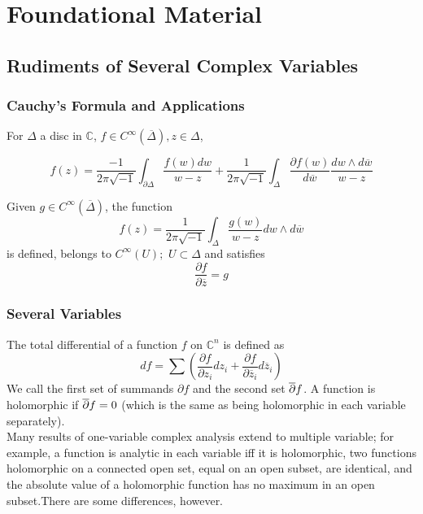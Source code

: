 
\section{Foundational Material}
\subsection{Rudiments of Several Complex Variables}
\subsubsection{Cauchy's Formula and Applications}


\begin{thm}

	For $\Delta$ a disc in $ \mathbb{C}$, $f \in C^{\infty}( \overline{\Delta} ), z \in \Delta$,

\[
	f(z) = \frac{-1}{2 \pi \sqrt{-1}} \int_{\partial \Delta} \frac{f(w)dw}{w-z}+ \frac{1}{2 \pi \sqrt{-1}} \int_{\Delta} \frac{\partial f(w)}{d \overline{w}} \frac{dw \wedge d \overline{w}}{w-z}
\]

\end{thm}



\begin{lem}

	Given $g \in C^{\infty}( \overline{\Delta} ) $, the function
\[
	f(z) = \frac{1}{2 \pi \sqrt{-1}} \int_{\Delta} \frac{g(w)}{w-z} dw \wedge d \overline{w}
\]
is defined, belongs to $ C^{\infty}( U ) ; \hspace{4pt} U \subset \Delta$ and satisfies
\[
	\frac{\partial f}{\partial \overline{z}}= g
\]
\end{lem}

\subsubsection{Several Variables}


\begin{defn}

The total differential of a function $f$ on $ \mathbb{C}^n$ is defined as
\[
	df = \sum \left( \frac{ \partial f }{\partial z_i } dz_i + \frac{ \partial f }{\partial \overline{z}_i } d\overline{z}_i \right)  
\]
We call the first set of summands $ \partial f$ and the second set $\overline{\partial} f$. A function is holomorphic if $ \overline{\partial} f = 0$ (which is the same as being holomorphic in each variable separately).\\
\indent Many results of one-variable complex analysis extend to multiple variable; for example, a function is analytic in each variable iff it is holomorphic, two functions holomorphic on a connected open set, equal on an open subset, are identical, and the absolute value of a holomorphic function has no maximum in an open subset.There are some differences, however.

\end{defn}


